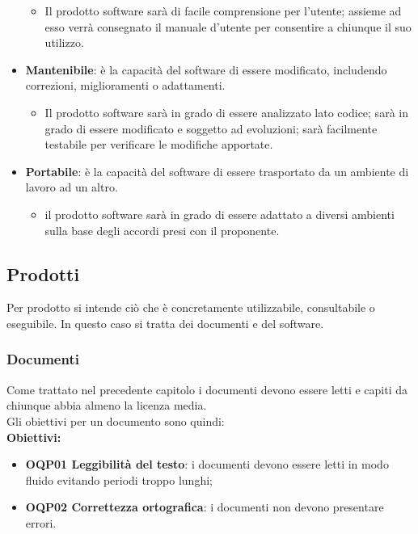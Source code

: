 \documentclass[../piano_di_qualifica.tex]{subfiles}
\begin{document}
\begin{itemize}
\begin{itemize}
		      \item Il prodotto software sarà di facile comprensione per l’utente; assieme ad esso verrà consegnato il manuale d’utente per consentire a chiunque il suo utilizzo.
	      \end{itemize}
	\item \textbf{Mantenibile}: è la capacità del software di essere modificato, includendo correzioni, miglioramenti o adattamenti.
	      \begin{itemize}
		      \item Il prodotto software sarà in grado di essere analizzato lato codice; sarà in grado di essere modificato e soggetto ad evoluzioni; sarà facilmente testabile per verificare le modifiche apportate.
	      \end{itemize}
	\item \textbf{Portabile}: è la capacità del software di essere trasportato da un ambiente di lavoro ad un altro.
	      \begin{itemize}
		      \item il prodotto software sarà in grado di essere adattato a diversi ambienti sulla base degli accordi presi con il proponente.
	      \end{itemize}
\end{itemize}

\subsection{Prodotti}
Per prodotto si intende ciò che è concretamente utilizzabile, consultabile o eseguibile. In questo caso si tratta dei documenti e del software.

\subsubsection{Documenti}
Come trattato nel precedente capitolo i documenti devono essere letti e capiti da chiunque abbia almeno la licenza media.\\
Gli obiettivi per un documento sono quindi: \\

\setlength{\parindent}{0pt}\textbf{Obiettivi:}
\smallbreak
\begin{itemize}
	\item \textbf{OQP01 Leggibilità del testo}: i documenti devono essere letti in modo fluido evitando periodi troppo lunghi; \\
	\item \textbf{OQP02 Correttezza ortografica}: i documenti non devono presentare errori.
\end{itemize}
\end{document}
